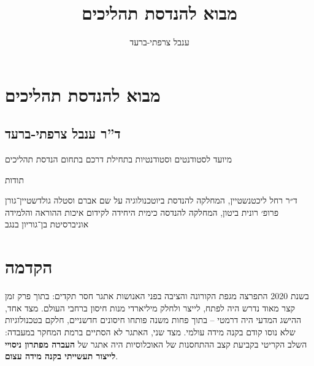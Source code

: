 \documentclass[
  hebrew,
  letterpaper,
  DIV=11,
  numbers=noendperiod]{scrreprt}
\title{מבוא להנדסת תהליכים}
\author{ענבל צרפתי-ברעד}
\date{}
\renewcommand*\contentsname{תוכן עניינים}
\newcommand\contentsname{תוכן עניינים}
\begin{document}
\maketitle

\renewcommand*\contentsname{תוכן עניינים}
{
\hypersetup{linkcolor=}
\setcounter{tocdepth}{2}
\tableofcontents
}


\chapter*{מבוא להנדסת
תהליכים}\label{ux5deux5d1ux5d5ux5d0-ux5dcux5d4ux5e0ux5d3ux5e1ux5ea-ux5eaux5d4ux5dcux5d9ux5dbux5d9ux5dd}


\section*{ד''ר ענבל
צרפתי-ברעד}\label{ux5d3ux5e8-ux5e2ux5e0ux5d1ux5dc-ux5e6ux5e8ux5e4ux5eaux5d9-ux5d1ux5e8ux5e2ux5d3}


מיועד לסטודנטים וסטודנטיות בתחילת דרכם בתחום הנדסת תהליכים

תודות

ד״ר רחל ליכטנשטיין, המחלקה להנדסת ביוטכנולוגיה על שם אברם וסטלה
גולדשטיין־גורן פרופ׳ רונית ביטון, המחלקה להנדסה כימית היחידה לקידום
איכות ההוראה והלמידה אוניברסיטת בן־גוריון בנגב


\chapter*{\texorpdfstring{{הקדמה}}{הקדמה}}\label{ux5d4ux5e7ux5d3ux5deux5d4}


{בשנת 2020 התפרצה מגפת הקורונה והציבה בפני האנושות אתגר חסר תקדים: בתוך
פרק זמן קצר מאוד נדרש היה לפתח, לייצר ולחלק מיליארדי מנות חיסון ברחבי
העולם. מצד אחד, ההישג המדעי היה דרמטי -- בתוך פחות משנה פותחו חיסונים
חדשניים, חלקם בטכנולוגיות שלא נוסו קודם בקנה מידה עולמי. מצד שני, האתגר
לא הסתיים ברמת המחקר במעבדה: השלב הקריטי בקביעת קצב ההתחסנות של
האוכלוסיות היה אתגר של \textbf{העברה מפתרון ניסויי לייצור תעשייתי בקנה
מידה עצום}}.
\end{document}

